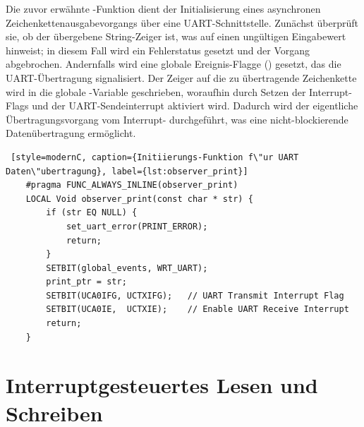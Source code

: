\newpage
Die zuvor erw\"ahnte -Funktion dient der Initialisierung eines asynchronen Zeichenkettenausgabevorgangs \"uber eine UART-Schnittstelle. Zun\"achst \"uberpr\"uft sie, ob der \"ubergebene String-Zeiger  ist, was auf einen ung\"ultigen Eingabewert hinweist; in diesem Fall wird ein Fehlerstatus gesetzt und der Vorgang abgebrochen. Andernfalls wird eine globale Ereignis-Flagge () gesetzt, das die UART-\"Ubertragung signalisiert. Der Zeiger auf die zu \"ubertragende Zeichenkette wird in die globale -Variable geschrieben, woraufhin durch Setzen der Interrupt-Flags  und  der UART-Sendeinterrupt aktiviert wird. Dadurch wird der eigentliche \"Ubertragungsvorgang vom Interrupt- durchgef\"uhrt, was eine nicht-blockierende Daten\"ubertragung erm\"oglicht.

\vspace{1cm}
\begin{lstlisting} [style=modernC, caption={Initiierungs-Funktion f\"ur UART Daten\"ubertragung}, label={lst:observer_print}]
	#pragma FUNC_ALWAYS_INLINE(observer_print)
	LOCAL Void observer_print(const char * str) {
		if (str EQ NULL) {
			set_uart_error(PRINT_ERROR);
			return;
		}
		SETBIT(global_events, WRT_UART);
		print_ptr = str;
		SETBIT(UCA0IFG, UCTXIFG);   // UART Transmit Interrupt Flag
		SETBIT(UCA0IE,  UCTXIE);    // Enable UART Receive Interrupt
		return;
	}
\end{lstlisting}


\newpage
\section{Interruptgesteuertes Lesen und Schreiben}
\label{sec:Interruptgesteuertes_Lesen&Schreiben}


